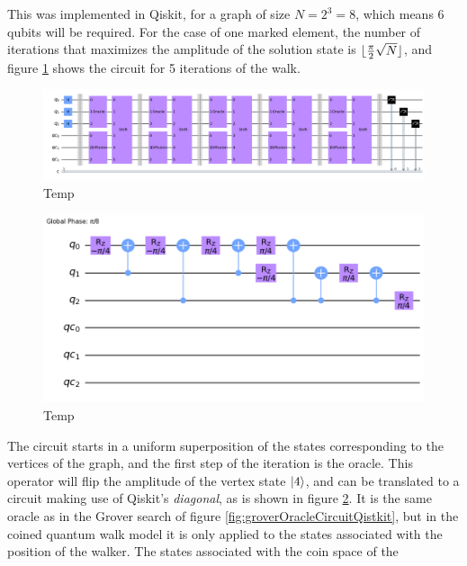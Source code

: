 \documentclass[../../dissertation.tex]{subfiles}
\begin{document}
This was implemented in Qiskit, for a graph of size $N=2^3=8$, which means $6$
qubits will be required. For the case of one marked element, the number of
iterations that maximizes the amplitude of the solution state is
$\lfloor\frac{\pi}{2} \sqrt{N}\rfloor$, and figure
\ref{fig:coinedQWSearchCircuitQistkit} shows the circuit for 5 iterations of
the walk.
\begin{figure}[!h]
	\centering
	\includegraphics[scale=0.21]{img/Qiskit/CoinedQuantumWalk/Search/Circuits/CoinedSearchQiskitCirc_N3_M0_S5.png}
	\caption{Temp} 
	\label{fig:coinedQWSearchCircuitQistkit}
\end{figure}
\begin{figure}[!h]
	\centering
	\includegraphics[scale=0.30]{img/Qiskit/CoinedQuantumWalk/Search/Circuits/CoinedSearchQiskitCircOracle_N3_M4_S5.png}
	\caption{Temp} 
	\label{fig:coinedQWSearchOracleCircuitQistkit}
\end{figure}\par
The circuit starts in a uniform superposition of the states corresponding to
the vertices of the graph, and the first step of the iteration is the oracle.
This operator will flip the amplitude of the vertex state $\ket{4}$, and can be
translated to a circuit making use of Qiskit's \textit{diagonal}, as is shown
in figure \ref{fig:coinedQWSearchOracleCircuitQistkit}. It is the same oracle
as in the Grover search of figure \ref{fig:groverOracleCircuitQistkit}, but in
the coined quantum walk model it is only applied to the states associated with
the position of the walker. The states associated with the coin space of the
\end{document}
